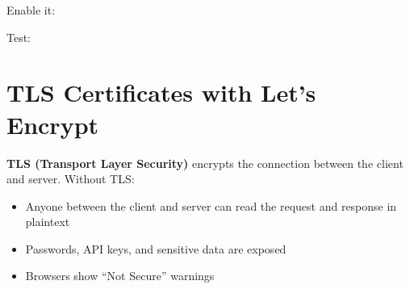 \noindent{}Enable it:

\begin{codebox}[short]

\begin{Shaded}
\begin{Highlighting}[]
 


 

\end{Highlighting}
\end{Shaded}

\end{codebox}

\noindent{}Test:

\begin{codebox}[short]

\begin{Shaded}
\begin{Highlighting}[]
\end{Highlighting}
\end{Shaded}

\end{codebox}

\setcounter{section}{4}
\section{TLS Certificates with Let's Encrypt}\label{28-traffic-routing:285-tls-certificates-with-lets-encrypt}

\textbf{TLS (Transport Layer Security)} encrypts the connection between the client and server. Without TLS:

\begin{itemize}
\tightlist
\item
  Anyone between the client and server can read the request and response in plaintext
\item
  Passwords, API keys, and sensitive data are exposed
\item
  Browsers show ``Not Secure'' warnings
\end{itemize}

